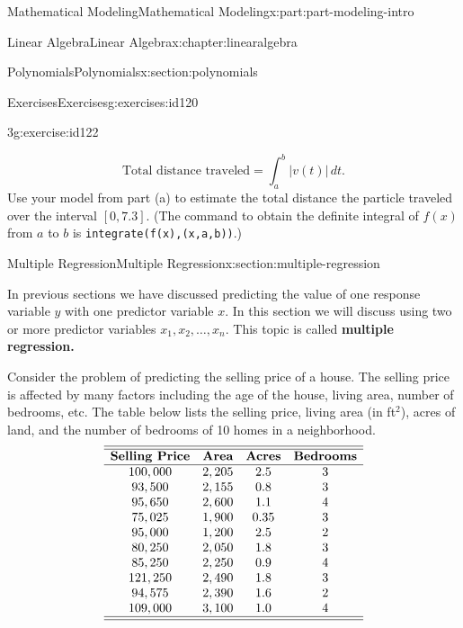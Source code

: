 \documentclass[oneside,10pt,]{book}
\newcommand{\mono}[1]{\texttt{#1}}
\newcommand{\terminology}[1]{\textbf{#1}}
\numberwithin{equation}{section}
\begin{document}
\begin{partptx}{Mathematical Modeling}{}{Mathematical Modeling}{}{}{x:part:part-modeling-intro}
\begin{chapterptx}{Linear Algebra}{}{Linear Algebra}{}{}{x:chapter:linearalgebra}
\begin{sectionptx}{Polynomials}{}{Polynomials}{}{}{x:section:polynomials}
\begin{exercises-subsection}{Exercises}{}{Exercises}{}{}{g:exercises:id120}
\begin{divisionexercise}{3}{}{}{g:exercise:id122}
\begin{enumerate}[font=\bfseries,label=(\alph*),ref=\alph*]
\begin{equation*}
\text{Total distance traveled} = \int_a^b |v(t)|\,dt.
\end{equation*}
Use your model from part (a) to estimate the total distance the particle traveled over the interval \([0,7.3]\). (The command to obtain the definite integral of \(f(x)\) from \(a\) to \(b\) is \mono{integrate(f(x),(x,a,b))}.)%
\end{enumerate}
\end{divisionexercise}%
\end{exercises-subsection}
\end{sectionptx}
%
%
\typeout{************************************************}
\typeout{************************************************}
%
\begin{sectionptx}{Multiple Regression}{}{Multiple Regression}{}{}{x:section:multiple-regression}
\begin{introduction}{}%
In previous sections we have discussed predicting the value of one response variable \(y\) with one predictor variable \(x\). In this section we will discuss using two or more predictor variables \(x_1, x_2, \dots , x_n\). This topic is called \terminology{multiple regression.}%
\par
Consider the problem of predicting the selling price of a house. The selling price is affected by many factors including the age of the house, living area, number of bedrooms, etc. The table below lists the selling price, living area (in ft\({}^2\)), acres of land, and the number of bedrooms of 10 homes in a neighborhood.%
%
\begin{equation*}
\begin{array}{cccc}\hline\hline
\textbf{Selling Price} & \textbf{Area} & \textbf{Acres} & \textbf{Bedrooms}\\\hline
100,000 & 2,205 & 2.5 & 3 \\
93,500 & 2,155 & 0.8 & 3 \\
95,650 & 2,600 & 1.1 & 4 \\
75,025 & 1,900 & 0.35 & 3 \\
95,000 & 1,200 & 2.5 & 2 \\
80,250 & 2,050 & 1.8 & 3 \\
85,250 & 2,250 & 0.9 & 4 \\
121,250 & 2,490 & 1.8 & 3 \\
94,575 & 2,390 & 1.6 & 2 \\
109,000 & 3,100 & 1.0 & 4 \\\hline\hline

\end{array}
\end{equation*}
\end{introduction}
\end{sectionptx}
\end{chapterptx}
\end{partptx}
\end{document}
